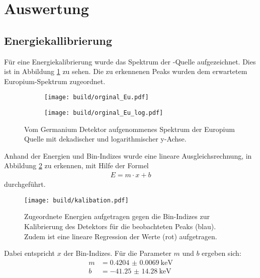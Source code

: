 \newpage
\section{Auswertung}
\label{sec:Auswertung}

\subsection{Energiekallibrierung}
\label{sec:Energiekallibrierung}

Für eine Energiekalibrierung wurde das Spektrum der -Quelle
aufgezeichnet. Dies ist in Abbildung \ref{plt:Eu-Spektrum} zu sehen. Die zu
erkennenen Peaks wurden dem erwartetem Europium-Spektrum zugeordnet.
\begin{figure}[htb]
  \begin{subfigure}{0.49\textwidth}
    \centering
    \texttt{[image: build/orginal\_Eu.pdf]}
  \end{subfigure}
  \begin{subfigure}{0.49\textwidth}
    \centering
    \texttt{[image: build/orginal\_Eu\_log.pdf]}
  \end{subfigure}
  \caption{Vom Germanium Detektor aufgenommenes Spektrum der Europium Quelle mit
  dekadischer und logarithmischer y-Achse.}
  \label{plt:Eu-Spektrum}
\end{figure}
Anhand der Energien und Bin-Indizes wurde eine lineare Ausgleichsrechnung, in
Abbildung \ref{plt:eichung} zu erkennen, mit Hilfe der Formel
\begin{align*}
  E = m \cdot x + b
\end{align*}
durchgeführt.
\begin{figure}[htb]
  \centering
  \texttt{[image: build/kalibation.pdf]}
  \caption{Zugeordnete Energien aufgetragen gegen die Bin-Indizes zur
  Kalibrierung des Detektors für die beobachteten Peaks (blau). Zudem ist eine
  lineare Regression der Werte (rot) aufgetragen.}
  \label{plt:eichung}
\end{figure}
Dabei entspricht $x$ der Bin-Indizes. Für die Parameter $m$ und
$b$ ergeben sich:
\begin{align*}
	m &= \SI{0.4204(69)}{\kilo\electronvolt} \\
  b &= \SI{-41.25(1428)}{\kilo\electronvolt}
\end{align*}


\FloatBarrier

